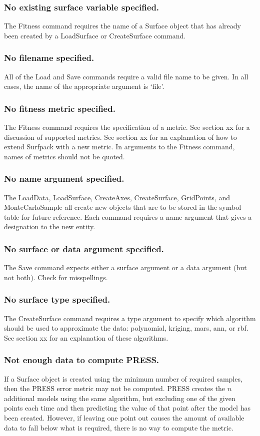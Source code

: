 \documentclass{article}
\begin{document}
\subsubsection{No existing surface variable specified.}
The Fitness command requires the name of a Surface object that has already been
created by a LoadSurface or CreateSurface command.

\subsubsection{No filename specified.}
All of the Load and Save commands require a valid file name to be given.  In all
cases, the name of the appropriate argument is `file'.

\subsubsection{No fitness metric specified.}
The Fitness command requires the specification of a metric.  See section xx for
a discussion of supported metrics.  See section xx for an explanation of how to
extend Surfpack with a new metric.  In arguments to the Fitness command, names
of metrics should not be quoted.
\subsubsection{No name argument specified.}
The LoadData, LoadSurface, CreateAxes, CreateSurface, GridPoints, and
MonteCarloSample all create new objects that are to be stored in the symbol
table for future reference.  Each command requires a name argument that gives a
designation to the new entity.

\subsubsection{No surface or data argument specified.}
The Save command expects either a surface argument or a data argument (but not
both).  Check for misspellings.

\subsubsection{No surface type specified.}
The CreateSurface command requires a type argument to specify which algorithm
should be used to approximate the data: polynomial, kriging, mars, ann, or rbf.
See section xx for an explanation of these algorithms.

\subsubsection{Not enough data to compute PRESS.}
If a Surface object is created using the minimum number of required samples,
then the PRESS error metric may not be computed.  PRESS creates the $n$
additional models using the same algorithm, but excluding one of the given
points each time and then predicting the value of that point after the model has
been created.  However, if leaving one point out causes the amount of available
data to fall below what is required, there is no way to compute the metric.
\end{document}
